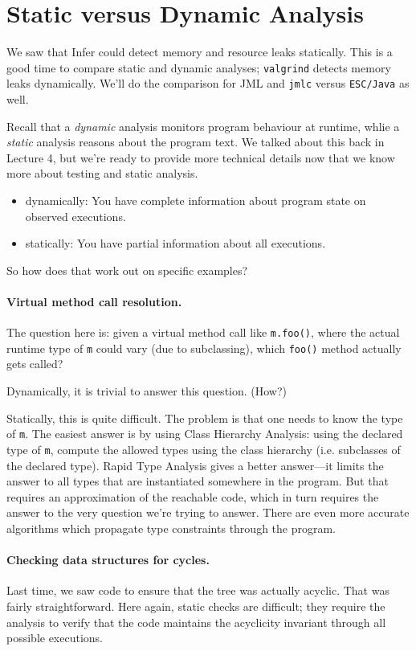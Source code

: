 \documentclass[11pt]{article}
\begin{document}
\section*{Static versus Dynamic Analysis}
We saw that Infer could detect memory and resource leaks
statically. This is a good time to compare static and dynamic
analyses; {\tt valgrind} detects memory leaks dynamically.  We'll do
the comparison for JML and {\tt jmlc} versus {\tt ESC/Java} as well.

Recall that a \emph{dynamic} analysis monitors program behaviour at runtime,
whlie a \emph{static} analysis reasons about the program text. We talked about this
back in Lecture 4, but we're ready to provide more technical details now that
we know more about testing and static analysis.

\begin{itemize}[noitemsep]
\item dynamically: You have complete information about program state on observed executions.
\item statically: You have partial information about all executions.
\end{itemize}

So how does that work out on specific examples?

\paragraph{Virtual method call resolution.} The question here is:
given a virtual method call like {\tt m.foo()}, where the actual runtime type of {\tt m} 
could vary (due to subclassing), which {\tt foo()} method actually gets called?

Dynamically, it is trivial to answer this question. (How?) 

Statically, this is quite difficult. The problem is that one needs to
know the type of {\tt m}.  The easiest answer is by using Class
Hierarchy Analysis: using the declared type of {\tt m}, compute the
allowed types using the class hierarchy (i.e. subclasses of the
declared type).  Rapid Type Analysis gives a better answer---it limits
the answer to all types that are instantiated somewhere in the
program. But that requires an approximation of the reachable code,
which in turn requires the answer to the very question we're trying to
answer.  There are even more accurate algorithms which propagate type
constraints through the program.

\paragraph{Checking data structures for cycles.} Last time, we saw code
to ensure that the tree was actually acyclic. That was fairly straightforward.
Here again, static checks are difficult; they require the analysis to verify that
the code maintains the acyclicity invariant through all possible executions.
\end{document}
